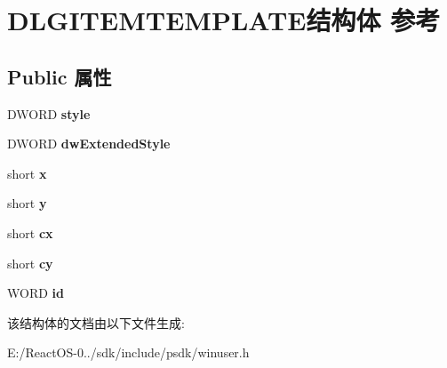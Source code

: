 \hypertarget{struct_d_l_g_i_t_e_m_t_e_m_p_l_a_t_e}{}\section{D\+L\+G\+I\+T\+E\+M\+T\+E\+M\+P\+L\+A\+T\+E结构体 参考}
\label{struct_d_l_g_i_t_e_m_t_e_m_p_l_a_t_e}
\subsection*{Public 属性}
\begin{DoxyCompactItemize}
\item 
\mbox{\label{struct_d_l_g_i_t_e_m_t_e_m_p_l_a_t_e_aebaf631fe1df64be442f5aa92e0edd9e}} 
D\+W\+O\+RD {\bfseries style}
\item 
\mbox{\label{struct_d_l_g_i_t_e_m_t_e_m_p_l_a_t_e_ada28ba8f7a45e6779c824918da20ce67}} 
D\+W\+O\+RD {\bfseries dw\+Extended\+Style}
\item 
\mbox{\label{struct_d_l_g_i_t_e_m_t_e_m_p_l_a_t_e_ac1b7f0ea17f44ad49efda5aeeddc9b6b}} 
short {\bfseries x}
\item 
\mbox{\label{struct_d_l_g_i_t_e_m_t_e_m_p_l_a_t_e_ab27cdf07567f3025d9bd3be780f13dc7}} 
short {\bfseries y}
\item 
\mbox{\label{struct_d_l_g_i_t_e_m_t_e_m_p_l_a_t_e_a033a58ad4b95352b609a77df40aecec0}} 
short {\bfseries cx}
\item 
\mbox{\label{struct_d_l_g_i_t_e_m_t_e_m_p_l_a_t_e_ab18c1426cae18e0d48bf80e51f54770f}} 
short {\bfseries cy}
\item 
\mbox{\label{struct_d_l_g_i_t_e_m_t_e_m_p_l_a_t_e_aee16cde3f642c414a40410f54f025a21}} 
W\+O\+RD {\bfseries id}
\end{DoxyCompactItemize}


该结构体的文档由以下文件生成\+:\begin{DoxyCompactItemize}
\item 
E\+:/\+React\+O\+S-\/0../sdk/include/psdk/winuser.\+h\end{DoxyCompactItemize}
